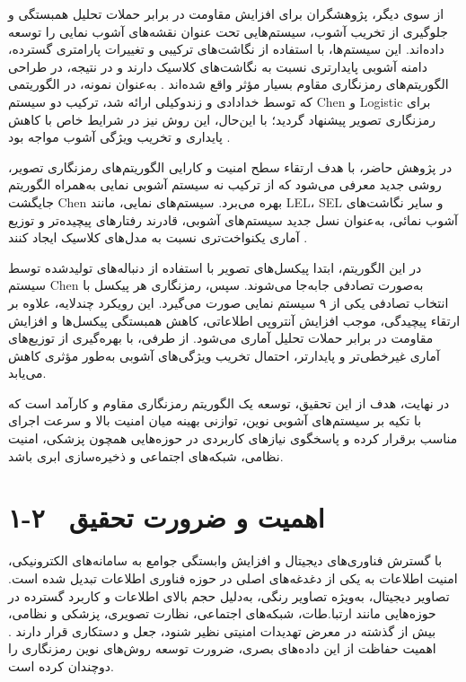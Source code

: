 از سوی دیگر، پژوهشگران برای افزایش مقاومت در برابر حملات تحلیل همبستگی و جلوگیری از تخریب آشوب، سیستم‌هایی تحت عنوان نقشه‌های آشوب نمایی را توسعه داده‌اند. این سیستم‌ها، با استفاده از نگاشت‌های ترکیبی و تغییرات پارامتری گسترده، دامنه آشوبی پایدارتری نسبت به نگاشت‌های کلاسیک دارند و در نتیجه، در طراحی الگوریتم‌های رمزنگاری مقاوم بسیار مؤثر واقع شده‌اند \cite{ref4}. به‌عنوان نمونه، در الگوریتمی که توسط خدادادی و زندوکیلی \cite{ref7} ارائه شد، ترکیب دو سیستم ‎Chen‎ و ‎Logistic‎ برای رمزنگاری تصویر پیشنهاد گردید؛ با این‌حال، این روش نیز در شرایط خاص با کاهش پایداری و تخریب ویژگی آشوب مواجه بود .

در پژوهش حاضر، با هدف ارتقاء سطح امنیت و کارایی الگوریتم‌های رمزنگاری تصویر، روشی جدید معرفی می‌شود که از ترکیب نه سیستم آشوبی نمایی به‌همراه الگوریتم جایگشت ‎Chen‎ بهره می‌برد. سیستم‌های نمایی، مانند ‎LEL‎، ‎SEL‎ و سایر نگاشت‌های آشوب نمائی، به‌عنوان نسل جدید سیستم‌های آشوبی، قادرند رفتارهای پیچیده‌تر و توزیع آماری یکنواخت‌تری نسبت به مدل‌های کلاسیک ایجاد کنند \cite{ref4}.

در این الگوریتم، ابتدا پیکسل‌های تصویر با استفاده از دنباله‌های تولیدشده توسط سیستم ‎Chen‎ به‌صورت تصادفی جابه‌جا می‌شوند. سپس، رمزنگاری هر پیکسل با انتخاب تصادفی یکی از ۹ سیستم نمایی صورت می‌گیرد. این رویکرد چندلایه، علاوه بر ارتقاء پیچیدگی، موجب افزایش آنتروپی اطلاعاتی، کاهش همبستگی پیکسل‌ها و افزایش مقاومت در برابر حملات تحلیل آماری می‌شود. از طرفی، با بهره‌گیری از توزیع‌های آماری غیرخطی‌تر و پایدارتر، احتمال تخریب ویژگی‌های آشوبی به‌طور مؤثری کاهش می‌یابد.

در نهایت، هدف از این تحقیق، توسعه یک الگوریتم رمزنگاری مقاوم و کارآمد است که با تکیه بر سیستم‌های آشوبی نوین، توازنی بهینه میان امنیت بالا و سرعت اجرای مناسب برقرار کرده و پاسخگوی نیازهای کاربردی در حوزه‌هایی همچون پزشکی، امنیت نظامی، شبکه‌های اجتماعی و ذخیره‌سازی ابری باشد.

\section{۱-۲  اهمیت و ضرورت تحقیق}

با گسترش فناوری‌های دیجیتال و افزایش وابستگی جوامع به سامانه‌های الکترونیکی، امنیت اطلاعات به یکی از دغدغه‌های اصلی در حوزه فناوری اطلاعات تبدیل شده است. تصاویر دیجیتال، به‌ویژه تصاویر رنگی، به‌دلیل حجم بالای اطلاعات و کاربرد گسترده در حوزه‌هایی مانند ارتبا.طات، شبکه‌های اجتماعی، نظارت تصویری، پزشکی و نظامی، بیش از گذشته در معرض تهدیدات امنیتی نظیر شنود، جعل و دستکاری قرار دارند \cite{ref10}. اهمیت حفاظت از این داده‌های بصری، ضرورت توسعه روش‌های نوین رمزنگاری را دوچندان کرده است.

